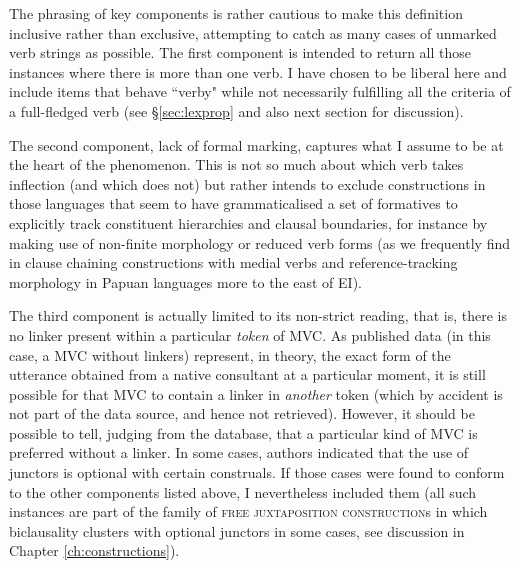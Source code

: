 The phrasing of key components is rather cautious to make this definition inclusive rather than exclusive, attempting to catch as many cases of unmarked verb strings as possible. The first component is intended to return all those instances where there is more than one verb. I have chosen to be liberal here and include items that behave ``verby" while not necessarily fulfilling all the criteria of a full-fledged verb (see §\ref{sec:lexprop} and also next section for discussion). 

The second component, lack of formal marking, captures what I assume to be at the heart of the phenomenon. This is not so much about which verb takes inflection (and which does not) but rather intends to exclude constructions in those languages that seem to have grammaticalised a set of formatives to explicitly track constituent hierarchies and clausal boundaries, for instance by making use of non-finite morphology or reduced verb forms (as we frequently find in clause chaining constructions with medial verbs and reference-tracking morphology in Papuan languages more to the east of EI). 

The third component is actually limited to its non-strict reading, that is, there is no linker present within a particular \emph{token} of MVC. As published data (in this case, a MVC without linkers) represent, in theory, the exact form of the utterance obtained from a native consultant at a particular moment, it is still possible for that MVC to contain a linker in \emph{another} token (which by accident is not part of the data source, and hence not retrieved). However, it should be possible to tell, judging from the database, that a particular kind of MVC is preferred without a linker. In some cases, authors indicated that the use of junctors is optional with certain construals. If those cases were found to conform to the other components listed above, I nevertheless included them (all such instances are part of the family of \textsc{free juxtaposition construction}s in which biclausality clusters with optional junctors in some cases, see discussion in Chapter \ref{ch:constructions}).

